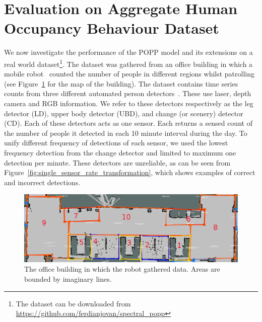 
\section{Evaluation on Aggregate Human Occupancy Behaviour Dataset}
\label{sec:evareal}

We now investigate the performance of the POPP model and its extensions on a real world dataset\footnote{The dataset can be downloaded from \url{https://github.com/ferdianjovan/spectral_popp}}.
% 
The dataset was gathered from an office building in which a mobile robot~\cite{hawes2016strands} counted the number of people in different regions whilst patrolling (see Figure~\ref{fig:map_popp_independent_test} for the map of the building). The dataset contains time series  counts from three different automated person detectors~\cite{dondrup2015real}. These use laser, depth camera and RGB information. We refer to these detectors respectively as the leg detector (LD), upper body detector (UBD), and change (or scenery) detector (CD). Each of these detectors acts as one sensor. Each returns a sensed count of the number of people it detected in each 10 minute interval during the day. To unify different frequency of detections of each sensor, we used the lowest frequency detection from the change detector and limited to maximum one detection per minute. These detectors are unreliable, as can be seen from Figure~\ref{fig:single_sensor_rate_transformation}, which shows examples of correct and incorrect detections.

\begin{figure}[t]
	\centering
	\includegraphics[width=0.8\columnwidth]{./figures/map_popp.png}
	\caption{The office building in which the robot gathered data. Areas are bounded by imaginary lines.}
	\label{fig:map_popp_independent_test}
	\vspace{-20pt}
\end{figure}

